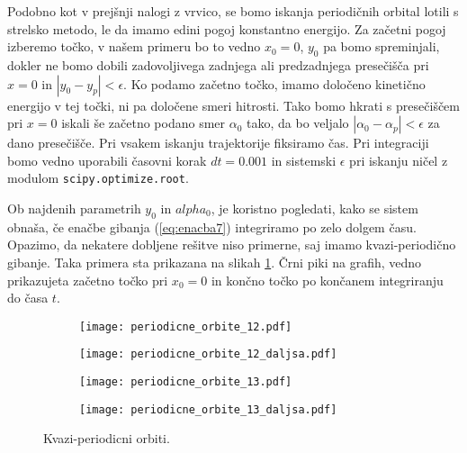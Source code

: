 \documentclass[12pt,a4paper]{article}
\begin{document}
Podobno kot v prejšnji nalogi z vrvico, se bomo iskanja periodičnih orbital lotili s strelsko metodo, le da imamo edini pogoj konstantno energijo. Za začetni pogoj izberemo točko, v našem primeru bo to vedno $x_0=0$, $y_0$ pa bomo spreminjali, dokler ne bomo dobili zadovoljivega zadnjega  ali predzadnjega presečišča pri $x=0$ in $|y_0-y_p|< \epsilon$. Ko podamo začetno točko, imamo določeno kinetično energijo v tej točki, ni pa določene smeri hitrosti. Tako bomo hkrati s presečiščem pri $x=0$ iskali še začetno podano smer $\alpha_0$ tako, da bo veljalo $|\alpha_0 - \alpha_p| < \epsilon $ za dano presečišče. Pri vsakem iskanju trajektorije fiksiramo čas. Pri integraciji bomo vedno uporabili časovni korak $dt=0.001$ in sistemski $\epsilon$ pri iskanju ničel z modulom \texttt{scipy.optimize.root}.

Ob najdenih parametrih $y_0$ in $alpha_0$, je koristno pogledati, kako se sistem obnaša, če enačbe gibanja (\ref{eq:enacba7}) integriramo po zelo dolgem času. Opazimo, da nekatere dobljene rešitve niso primerne, saj imamo kvazi-periodično gibanje. Taka primera sta prikazana na slikah \ref{fig:slika8}. Črni piki na grafih, vedno prikazujeta začetno točko pri $x_0=0$ in končno točko po končanem integriranju do časa $t$.

\begin{figure}[H]
    \centering
    \begin{subfigure}[b]{0.45\textwidth}  			
        \texttt{[image: periodicne\_orbite\_12.pdf]}
    \end{subfigure}
    \begin{subfigure}[b]{0.45\textwidth}  			
        \texttt{[image: periodicne\_orbite\_12\_daljsa.pdf]}
    \end{subfigure}
   
        \begin{subfigure}[b]{0.45\textwidth}  			
        \texttt{[image: periodicne\_orbite\_13.pdf]}
    \end{subfigure}
    \begin{subfigure}[b]{0.45\textwidth}  			
        \texttt{[image: periodicne\_orbite\_13\_daljsa.pdf]}
    \end{subfigure}
    \caption{Kvazi-periodicni orbiti.} 
    \label{fig:slika8}
\end{figure}
\end{document}
